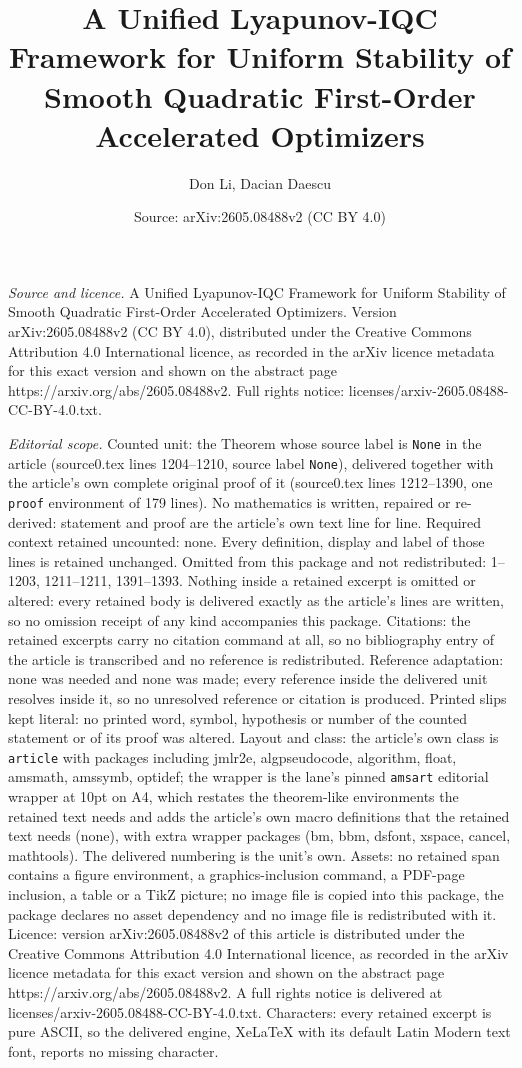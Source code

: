\documentclass[10pt,a4paper]{amsart}
\title[A Unified Lyapunov-IQC Framework for Uniform Stability of Sm]{A Unified Lyapunov-IQC Framework for Uniform Stability of Smooth Quadratic First-Order Accelerated Optimizers}
\author{Don Li, Dacian Daescu}
\date{Source: arXiv:2605.08488v2 (CC BY 4.0)}
\begin{document}
\maketitle

\noindent\emph{Source and licence.} A Unified Lyapunov-IQC Framework for Uniform Stability of Smooth Quadratic First-Order Accelerated Optimizers. Version arXiv:2605.08488v2 (CC BY 4.0), distributed under the Creative Commons Attribution 4.0 International licence, as recorded in the arXiv licence metadata for this exact version and shown on the abstract page https://arxiv.org/abs/2605.08488v2. Full rights notice: licenses/arxiv-2605.08488-CC-BY-4.0.txt.\par\smallskip

\noindent\textit{Editorial scope.} Counted unit: the Theorem whose source label is \texttt{None} in the article (source0.tex lines 1204--1210, source label \texttt{None}), delivered together with the article's own complete original proof of it (source0.tex lines 1212--1390, one \texttt{proof} environment of 179 lines). No mathematics is written, repaired or re-derived: statement and proof are the article's own text line for line. Required context retained uncounted: none. Every definition, display and label of those lines is retained unchanged. Omitted from this package and not redistributed: 1--1203, 1211--1211, 1391--1393. Nothing inside a retained excerpt is omitted or altered: every retained body is delivered exactly as the article's lines are written, so no omission receipt of any kind accompanies this package. Citations: the retained excerpts carry no citation command at all, so no bibliography entry of the article is transcribed and no reference is redistributed. Reference adaptation: none was needed and none was made; every reference inside the delivered unit resolves inside it, so no unresolved reference or citation is produced. Printed slips kept literal: no printed word, symbol, hypothesis or number of the counted statement or of its proof was altered. Layout and class: the article's own class is \texttt{article} with packages including jmlr2e, algpseudocode, algorithm, float, amsmath, amssymb, optidef; the wrapper is the lane's pinned \texttt{amsart} editorial wrapper at 10pt on A4, which restates the theorem-like environments the retained text needs and adds the article's own macro definitions that the retained text needs (none), with extra wrapper packages (bm, bbm, dsfont, xspace, cancel, mathtools). The delivered numbering is the unit's own. Assets: no retained span contains a figure environment, a graphics-inclusion command, a PDF-page inclusion, a table or a TikZ picture; no image file is copied into this package, the package declares no asset dependency and no image file is redistributed with it. Licence: version arXiv:2605.08488v2 of this article is distributed under the Creative Commons Attribution 4.0 International licence, as recorded in the arXiv licence metadata for this exact version and shown on the abstract page https://arxiv.org/abs/2605.08488v2. A full rights notice is delivered at licenses/arxiv-2605.08488-CC-BY-4.0.txt. Characters: every retained excerpt is pure ASCII, so the delivered engine, XeLaTeX with its default Latin Modern text font, reports no missing character.
\end{document}
